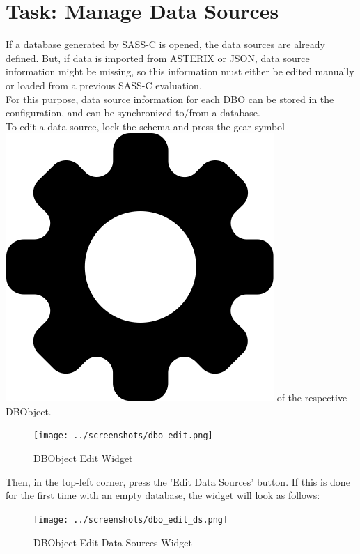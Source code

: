 \section{Task: Manage Data Sources}
\label{sec:task_manage_datasources}

If a database generated by SASS-C is opened, the data sources are already defined. But, if data is imported from ASTERIX or JSON, data source information might be missing, so this information must either be edited manually or loaded from a previous SASS-C evaluation. \\

For this purpose, data source information for each DBO can be stored in the configuration, and can be synchronized to/from a database. \\

To edit a data source, lock the schema and press the gear symbol \includegraphics[scale=0.02]{../../data/icons/edit.png} of the respective DBObject.

\begin{figure}[H]
  \hspace*{-1.5cm}
    \texttt{[image: ../screenshots/dbo\_edit.png]}
  \caption{DBObject Edit Widget}
  \label{fig:dbo_edit}
\end{figure}

Then, in the top-left corner, press the 'Edit Data Sources' button. If this is done for the first time with an empty database, the widget will look as follows:

\begin{figure}[H]
  \hspace*{-1cm}
    \texttt{[image: ../screenshots/dbo\_edit\_ds.png]}
  \caption{DBObject Edit Data Sources Widget}
  \label{fig:dbo_edit_ds}
\end{figure}


